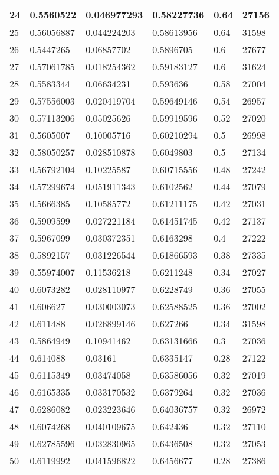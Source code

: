 \begin{longtable}{|l|l|l|l|l|l|}
24 & 0.5560522 & 0.046977293 & 0.58227736 & 0.64 & 27156 \\ \hline 
25 & 0.56056887 & 0.044224203 & 0.58613956 & 0.64 & 31598 \\ \hline 
26 & 0.5447265 & 0.06857702 & 0.5896705 & 0.6 & 27677 \\ \hline 
27 & 0.57061785 & 0.018254362 & 0.59183127 & 0.6 & 31624 \\ \hline 
28 & 0.5583344 & 0.06634231 & 0.593636 & 0.58 & 27004 \\ \hline 
29 & 0.57556003 & 0.020419704 & 0.59649146 & 0.54 & 26957 \\ \hline 
30 & 0.57113206 & 0.05025626 & 0.59919596 & 0.52 & 27020 \\ \hline 
31 & 0.5605007 & 0.10005716 & 0.60210294 & 0.5 & 26998 \\ \hline 
32 & 0.58050257 & 0.028510878 & 0.6049803 & 0.5 & 27134 \\ \hline 
33 & 0.56792104 & 0.10225587 & 0.60715556 & 0.48 & 27242 \\ \hline 
34 & 0.57299674 & 0.051911343 & 0.6102562 & 0.44 & 27079 \\ \hline 
35 & 0.5666385 & 0.10585772 & 0.61211175 & 0.42 & 27031 \\ \hline 
36 & 0.5909599 & 0.027221184 & 0.61451745 & 0.42 & 27137 \\ \hline 
37 & 0.5967099 & 0.030372351 & 0.6163298 & 0.4 & 27222 \\ \hline 
38 & 0.5892157 & 0.031226544 & 0.61866593 & 0.38 & 27335 \\ \hline 
39 & 0.55974007 & 0.11536218 & 0.6211248 & 0.34 & 27027 \\ \hline 
40 & 0.6073282 & 0.028110977 & 0.6228749 & 0.36 & 27055 \\ \hline 
41 & 0.606627 & 0.030003073 & 0.62588525 & 0.36 & 27002 \\ \hline 
42 & 0.611488 & 0.026899146 & 0.627266 & 0.34 & 31598 \\ \hline 
43 & 0.5864949 & 0.10941462 & 0.63131666 & 0.3 & 27036 \\ \hline 
44 & 0.614088 & 0.03161 & 0.6335147 & 0.28 & 27122 \\ \hline 
45 & 0.6115349 & 0.03474058 & 0.63586056 & 0.32 & 27019 \\ \hline 
46 & 0.6165335 & 0.033170532 & 0.6379264 & 0.32 & 27036 \\ \hline 
47 & 0.6286082 & 0.023223646 & 0.64036757 & 0.32 & 26972 \\ \hline 
48 & 0.6074268 & 0.040109675 & 0.642436 & 0.32 & 27110 \\ \hline 
49 & 0.62785596 & 0.032830965 & 0.6436508 & 0.32 & 27053 \\ \hline 
50 & 0.6119992 & 0.041596822 & 0.6456677 & 0.28 & 27386 \\ \hline 
\end{longtable}